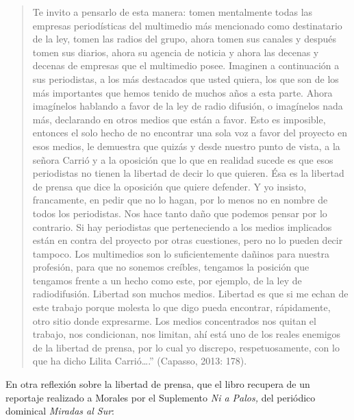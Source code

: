 \begin{quote}
Te invito a pensarlo de esta manera: tomen mentalmente todas las empresas periodísticas del multimedio más mencionado como destinatario de la ley, tomen las radios del grupo, ahora tomen sus canales y después tomen sus diarios, ahora su agencia de noticia y ahora las decenas y decenas de empresas que el multimedio posee. Imaginen a continuación a sus periodistas, a los más destacados que usted quiera, los que son de los más importantes que hemos tenido de muchos años a esta parte. Ahora imagínelos hablando a favor de la ley de radio difusión, o imagínelos nada más, declarando en otros medios que están a favor. Esto es imposible, entonces el solo hecho de no encontrar una sola voz a favor del proyecto en esos medios, le demuestra que quizás y desde nuestro punto de vista, a la señora Carrió y a la oposición que lo que en realidad sucede es que esos periodistas no tienen la libertad de decir lo que quieren. Ésa es la libertad de prensa que dice la oposición que quiere defender. Y yo insisto, francamente, en pedir que no lo hagan, por lo menos no en nombre de todos los periodistas. Nos hace tanto daño que podemos pensar por lo contrario. Si hay periodistas que perteneciendo a los medios implicados están en contra del proyecto por otras cuestiones, pero no lo pueden decir tampoco. Los multimedios son lo suficientemente dañinos para nuestra profesión, para que no sonemos creíbles, tengamos la posición que tengamos frente a un hecho como este, por ejemplo, de la ley de radiodifusión. Libertad son muchos medios. Libertad es que si me echan de este trabajo porque molesta lo que digo pueda encontrar, rápidamente, otro sitio donde expresarme. Los medios concentrados nos quitan el trabajo, nos condicionan, nos limitan, ahí está uno de los reales enemigos de la libertad de prensa, por lo cual yo discrepo, respetuosamente, con lo que ha dicho Lilita Carrió\ldots.'' (Capasso, 2013: 178).
\end{quote}

En otra reflexión sobre la libertad de prensa, que el libro recupera de un reportaje realizado a Morales por el Suplemento \emph{Ni a Palos,} del periódico dominical \emph{Miradas al Sur}:

